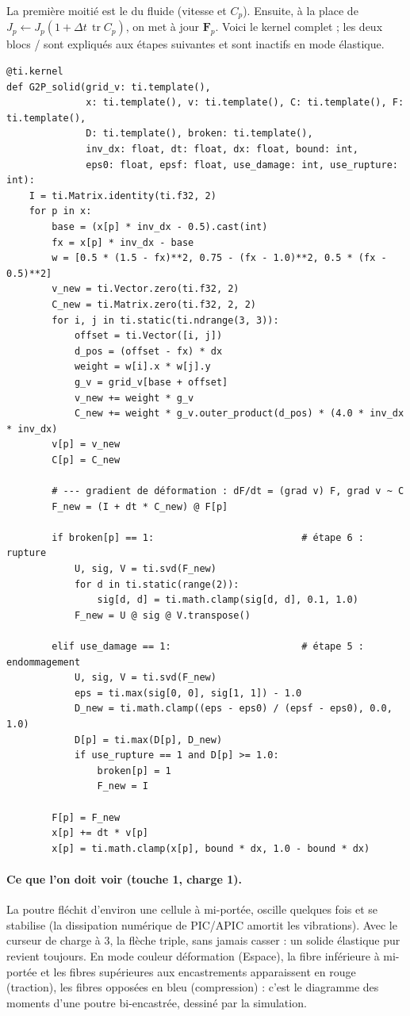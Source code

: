 \documentclass[11pt,a4paper]{article}
\newcommand{\code}[1]{\texttt{\detokenize{#1}}}
\newcommand{\tr}{\operatorname{tr}}
\begin{document}
La première moitié est le \code{G2P} du fluide (vitesse et $C_p$). Ensuite, à la place de
$J_p \leftarrow J_p(1+\Delta t\,\tr C_p)$, on met à jour $\mathbf F_p$. Voici le kernel complet ;
les deux blocs \code{if broken} / \code{elif use_damage} sont expliqués aux étapes suivantes
et sont inactifs en mode élastique.

\begin{lstlisting}
@ti.kernel
def G2P_solid(grid_v: ti.template(),
              x: ti.template(), v: ti.template(), C: ti.template(), F: ti.template(),
              D: ti.template(), broken: ti.template(),
              inv_dx: float, dt: float, dx: float, bound: int,
              eps0: float, epsf: float, use_damage: int, use_rupture: int):
    I = ti.Matrix.identity(ti.f32, 2)
    for p in x:
        base = (x[p] * inv_dx - 0.5).cast(int)
        fx = x[p] * inv_dx - base
        w = [0.5 * (1.5 - fx)**2, 0.75 - (fx - 1.0)**2, 0.5 * (fx - 0.5)**2]
        v_new = ti.Vector.zero(ti.f32, 2)
        C_new = ti.Matrix.zero(ti.f32, 2, 2)
        for i, j in ti.static(ti.ndrange(3, 3)):
            offset = ti.Vector([i, j])
            d_pos = (offset - fx) * dx
            weight = w[i].x * w[j].y
            g_v = grid_v[base + offset]
            v_new += weight * g_v
            C_new += weight * g_v.outer_product(d_pos) * (4.0 * inv_dx * inv_dx)
        v[p] = v_new
        C[p] = C_new

        # --- gradient de déformation : dF/dt = (grad v) F, grad v ~ C
        F_new = (I + dt * C_new) @ F[p]

        if broken[p] == 1:                          # étape 6 : rupture
            U, sig, V = ti.svd(F_new)
            for d in ti.static(range(2)):
                sig[d, d] = ti.math.clamp(sig[d, d], 0.1, 1.0)
            F_new = U @ sig @ V.transpose()

        elif use_damage == 1:                       # étape 5 : endommagement
            U, sig, V = ti.svd(F_new)
            eps = ti.max(sig[0, 0], sig[1, 1]) - 1.0
            D_new = ti.math.clamp((eps - eps0) / (epsf - eps0), 0.0, 1.0)
            D[p] = ti.max(D[p], D_new)
            if use_rupture == 1 and D[p] >= 1.0:
                broken[p] = 1
                F_new = I

        F[p] = F_new
        x[p] += dt * v[p]
        x[p] = ti.math.clamp(x[p], bound * dx, 1.0 - bound * dx)
\end{lstlisting}

\paragraph{Ce que l'on doit voir (touche 1, charge 1).} La poutre fléchit d'environ une cellule
à mi-portée, oscille quelques fois et se stabilise (la dissipation numérique de PIC/APIC amortit
les vibrations). Avec le curseur de charge à 3, la flèche triple, sans jamais casser : un solide
élastique pur revient toujours. En mode couleur \og déformation \fg{} (Espace), la fibre
inférieure à mi-portée et les fibres supérieures aux encastrements apparaissent en rouge
(traction), les fibres opposées en bleu (compression) : c'est le diagramme des moments d'une
poutre bi-encastrée, dessiné par la simulation.
\end{document}
